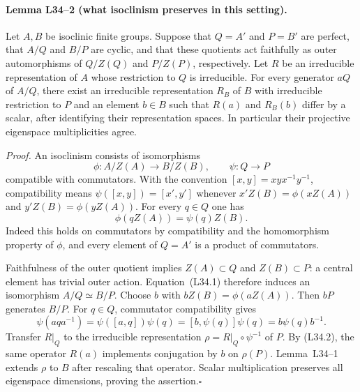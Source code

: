 \paragraph{Lemma L34--2 (what isoclinism preserves in this setting).}
Let $A,B$ be isoclinic finite groups.  Suppose that
$Q=A'$ and $P=B'$ are perfect, that $A/Q$ and $B/P$ are cyclic,
and that these quotients act faithfully as outer automorphisms of
$Q/Z(Q)$ and $P/Z(P)$, respectively.  Let $R$ be an irreducible
representation of $A$ whose restriction to $Q$ is irreducible.
For every generator $aQ$ of $A/Q$, there exist an irreducible
representation $R_B$ of $B$ with irreducible restriction to $P$ and
an element $b\in B$ such that $R(a)$ and $R_B(b)$ differ by a scalar,
after identifying their representation spaces.  In particular their
projective eigenspace multiplicities agree.

\emph{Proof.}
An isoclinism consists of isomorphisms
\[
 \phi:A/Z(A)\longrightarrow B/Z(B),\qquad
 \psi:Q\longrightarrow P
\]
compatible with commutators.  With the convention
$[x,y]=xyx^{-1}y^{-1}$, compatibility means
$\psi([x,y])=[x',y']$ whenever $x'Z(B)=\phi(xZ(A))$ and
$y'Z(B)=\phi(yZ(A))$.
For every $q\in Q$ one has
\[
       \phi(qZ(A))=\psi(q)Z(B).                    \tag{L34.1}
\]
Indeed this holds on commutators by compatibility and the homomorphism
property of $\phi$, and every element of $Q=A'$ is a product of
commutators.

Faithfulness of the outer quotient implies $Z(A)\subset Q$ and
$Z(B)\subset P$: a central element has trivial outer action.
Equation~(L34.1) therefore induces an isomorphism $A/Q\simeq B/P$.
Choose $b$ with $bZ(B)=\phi(aZ(A))$.  Then $bP$ generates $B/P$.
For $q\in Q$, commutator compatibility gives
\[
 \psi(aqa^{-1})
   =\psi([a,q])\psi(q)
   =[b,\psi(q)]\psi(q)=b\psi(q)b^{-1}.             \tag{L34.2}
\]
Transfer $R|_Q$ to the irreducible representation
$\rho=R|_Q\circ\psi^{-1}$ of $P$.  By (L34.2), the same operator
$R(a)$ implements conjugation by $b$ on $\rho(P)$.
Lemma~L34--1 extends $\rho$ to $B$ after rescaling that operator.
Scalar multiplication preserves all eigenspace dimensions, proving
the assertion.\hfill$\square$

